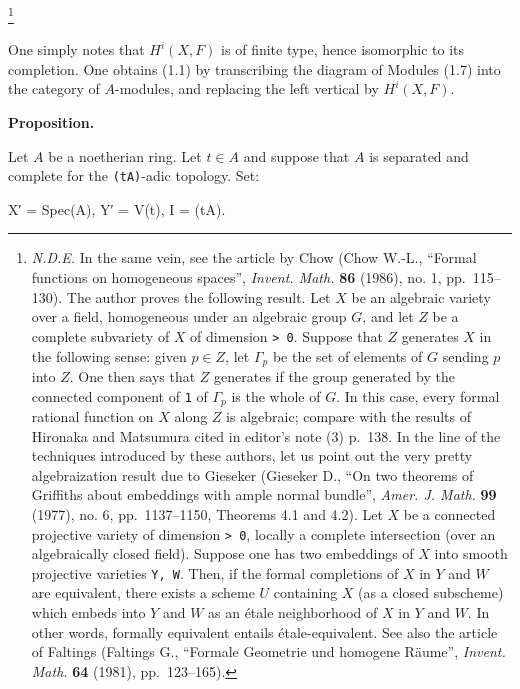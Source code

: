 \documentclass[
  11pt,
  a4paper,
]{book}
\newenvironment{Shaded}{}{}
\newcommand{\NormalTok}[1]{#1}
\begin{document}
\footnote{\emph{N.D.E.} In the same vein, see the article by Chow (Chow
  W.-L., ``Formal functions on homogeneous spaces'', \emph{Invent.
  Math.} \textbf{86} (1986), no. 1, pp.~115--130). The author proves the
  following result. Let \(X\) be an algebraic variety over a field,
  homogeneous under an algebraic group \(G\), and let \(Z\) be a
  complete subvariety of \(X\) of dimension \texttt{\textgreater{}\ 0}.
  Suppose that \(Z\) generates \(X\) in the following sense: given
  \(p \in Z\), let \(\Gamma_{p}\) be the set of elements of \(G\)
  sending \(p\) into \(Z\). One then says that \(Z\) generates if the
  group generated by the connected component of \texttt{1} of
  \(\Gamma_{p}\) is the whole of \(G\). In this case, every formal
  rational function on \(X\) along \(Z\) is algebraic; compare with the
  results of Hironaka and Matsumura cited in editor's note (3) p.~138.
  In the line of the techniques introduced by these authors, let us
  point out the very pretty algebraization result due to Gieseker
  (Gieseker D., ``On two theorems of Griffiths about embeddings with
  ample normal bundle'', \emph{Amer. J. Math.} \textbf{99} (1977), no.
  6, pp.~1137--1150, Theorems 4.1 and 4.2). Let \(X\) be a connected
  projective variety of dimension \texttt{\textgreater{}\ 0}, locally a
  complete intersection (over an algebraically closed field). Suppose
  one has two embeddings of \(X\) into smooth projective varieties
  \texttt{Y,\ W}. Then, if the formal completions of \(X\) in \(Y\) and
  \(W\) are equivalent, there exists a scheme \(U\) containing \(X\) (as
  a closed subscheme) which embeds into \(Y\) and \(W\) as an étale
  neighborhood of \(X\) in \(Y\) and \(W\). In other words, formally
  equivalent entails étale-equivalent. See also the article of Faltings
  (Faltings G., ``Formale Geometrie und homogene Räume'', \emph{Invent.
  Math.} \textbf{64} (1981), pp.~123--165).}

One simply notes that \(H^{i}(X, F)\) is of finite type, hence
isomorphic to its completion. One obtains (1.1) by transcribing the
diagram of Modules (1.7) into the category of \(A\)-modules, and
replacing the left vertical by \(H^{i}(X,
F)\).

\textbf{Proposition.}

Let \(A\) be a noetherian ring. Let \(t \in A\) and suppose that \(A\)
is separated and complete for the \texttt{(tA)}-adic topology. Set:

\begin{Shaded}
\begin{Highlighting}[]
\NormalTok{X′ = Spec(A),    Y′ = V(t),    I = (tA).}
\end{Highlighting}
\end{Shaded}
\end{document}
